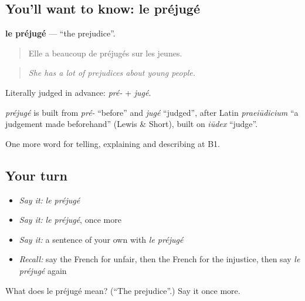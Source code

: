 \subsection*{You'll want to know: le préjugé}
\textbf{le préjugé} — \textquotedblleft{}the prejudice\textquotedblright{}.

\begin{quote}
Elle a beaucoup de préjugés sur les jeunes.
\end{quote}

\begin{quote}
\emph{She has a lot of prejudices about young people.}
\end{quote}

Literally judged in advance: \emph{pré-} + \emph{jugé}.

\begin{cousinweb}
\emph{préjugé} is built from \emph{pré-} \textquotedblleft{}before\textquotedblright{} and \emph{jugé} \textquotedblleft{}judged\textquotedblright{}, after Latin \emph{praeiūdicium} \textquotedblleft{}a judgement made beforehand\textquotedblright{} (Lewis \& Short), built on \emph{iūdex} \textquotedblleft{}judge\textquotedblright{}.
\end{cousinweb}

\begin{grammarlens}[title={What you've built}]
One more word for telling, explaining and describing at B1.
\end{grammarlens}

\subsection*{Your turn}
\begin{itemize}
\raggedright
  \item \emph{Say it:} \emph{le préjugé}
  \item \emph{Say it:} \emph{le préjugé}, once more
  \item \emph{Say it:} a sentence of your own with \emph{le préjugé}
  \item \emph{Recall:} say the French for unfair, then the French for the injustice, then say \emph{le préjugé} again
\end{itemize}

\begin{tcolorbox}[breakable,colback=teal!4,colframe=teal!35!black,title={Before you move on}]
What does le préjugé mean? (\textquotedblleft{}The prejudice\textquotedblright{}.) Say it once more.
\end{tcolorbox}
